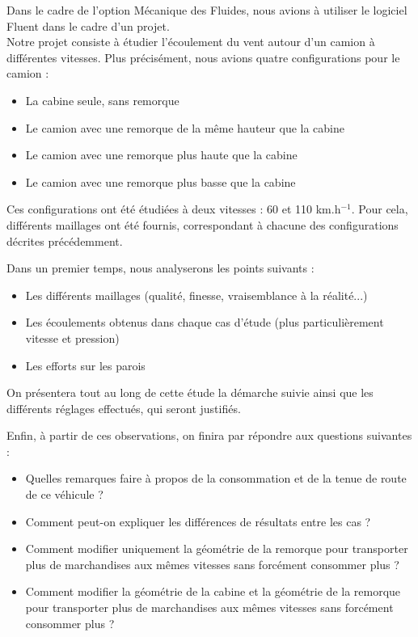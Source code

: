 Dans le cadre de l'option Mécanique des Fluides, nous avions à utiliser le logiciel Fluent dans le cadre d'un projet.\\
Notre projet consiste à étudier l'écoulement du vent autour d'un camion à différentes vitesses. Plus précisément, nous avions quatre configurations pour le camion :
\begin{itemize}
	\item La cabine seule, sans remorque
	\item Le camion avec une remorque de la même hauteur que la cabine
	\item Le camion avec une remorque plus haute que la cabine
	\item Le camion avec une remorque plus basse que la cabine
\end{itemize}
Ces configurations ont été étudiées à deux vitesses : 60 et 110 km.h$^{-1}$. Pour cela, différents maillages ont été fournis, correspondant à chacune des configurations décrites précédemment.

\bigskip
Dans un premier temps, nous analyserons les points suivants :
\begin{itemize}
	\item Les différents maillages (qualité, finesse, vraisemblance à la réalité...)
	\item Les écoulements obtenus dans chaque cas d'étude (plus particulièrement vitesse et pression)
	\item Les efforts sur les parois
\end{itemize}
On présentera tout au long de cette étude la démarche suivie ainsi que les différents réglages effectués, qui seront justifiés.

\bigskip
Enfin, à partir de ces observations, on finira par répondre aux questions suivantes :
\begin{itemize}
	\item Quelles remarques faire à propos de la consommation et de la tenue de route de ce véhicule ? 
	\item Comment peut-on expliquer les différences de résultats entre les cas ?
	\item Comment modifier uniquement la géométrie de la remorque pour transporter plus de marchandises aux mêmes vitesses sans forcément consommer plus ?
	\item Comment modifier la géométrie de la cabine et la géométrie de la remorque pour transporter plus de marchandises aux mêmes vitesses sans forcément consommer plus ?
\end{itemize}

